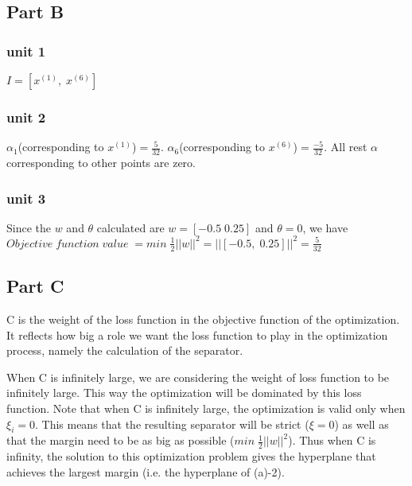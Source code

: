 \subsection{Part B}
\subsubsection{unit 1}
$I=[x^{(1)},\; x^{(6)}]$

\subsubsection{unit 2}
$\alpha_1$(corresponding to $x^{(1)}$)$=\frac{5}{32}$. $\alpha_6$(corresponding to $x^{(6)}$)$=\frac{-5}{32}$.  All rest $\alpha$ corresponding to other points are zero.

\subsubsection{unit 3}
Since the $w$ and $\theta$ calculated are $w=[-0.5 \;0.25]$ and $\theta=0$, we have
$Objective\;function\;value\;=min\;\frac{1}{2}||w||^2=||[-0.5,\;0.25]||^2=\frac{5}{32}$

\subsection{Part C}
C is the weight of the loss function in the objective function of the optimization. It reflects how big a role we want the loss function to play in the optimization process, namely the calculation of the separator. 

\noindent When C is infinitely large, we are considering the weight of loss function to be infinitely large. This way the optimization will be dominated by this loss function. Note that when C is infinitely large, the optimization is valid only when $\xi_i=0$. This means that the resulting separator will be strict ($\xi=0$) as well as that the margin need to be as  big as possible ($min \;\frac{1}{2}||w||^2$). Thus when C is infinity, the solution to this optimization problem gives the hyperplane that achieves the largest margin (i.e. the hyperplane of (a)-2). 

